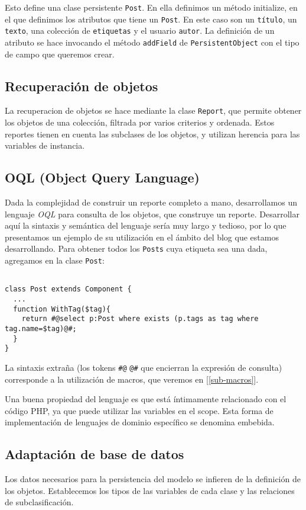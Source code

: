 Esto define una clase persistente \verb"Post". En ella definimos un método initialize, en el que definimos los atributos que tiene un \verb"Post". En este caso son un \verb"título", un \verb"texto", una colección de \verb"etiquetas" y el usuario \verb"autor". La definición de un atributo se hace invocando el método \verb"addField" de \verb"PersistentObject" con el tipo de campo que queremos crear.

\subsection{Recuperación de objetos}
La recuperacion de objetos se hace mediante la clase \verb"Report", que permite obtener los objetos de una colección, filtrada por varios criterios y ordenada. Estos reportes tienen en cuenta las subclases de los objetos, y utilizan herencia para las variables de instancia.

\subsection{OQL (Object Query Language)}
\label{sub-oql}
Dada la complejidad de construir un reporte completo a mano, desarrollamos un lenguaje \emph{OQL} para consulta de los objetos, que construye un reporte. Desarrollar aquí la sintaxis y semántica del lenguaje sería muy largo y tedioso, por lo que presentamos un ejemplo de su utilización en el ámbito del blog que estamos desarrollando. Para obtener todos los \verb"Posts" cuya etiqueta sea una dada, agregamos en la clase \verb"Post":

\begin{verbatim}

class Post extends Component {
  ...
  function WithTag($tag){
    return #@select p:Post where exists (p.tags as tag where tag.name=$tag)@#;
  }
}

\end{verbatim}

La sintaxis extraña (los tokens \verb"#@" \verb"@#" que encierran la expresión de consulta) corresponde a la utilización de macros, que veremos en [\ref{sub-macros}].

Una buena propiedad del lenguaje es que está íntimamente relacionado con el código PHP, ya que puede utilizar las variables en el scope. Esta forma de implementación de lenguajes de dominio específico se denomina embebida.

\subsection{Adaptación de base de datos}
\label{sub-adapt}
Los datos necesarios para la persistencia del modelo se infieren de la definición de los objetos. Establecemos los tipos de las variables de cada clase y las relaciones de subclasificación.

